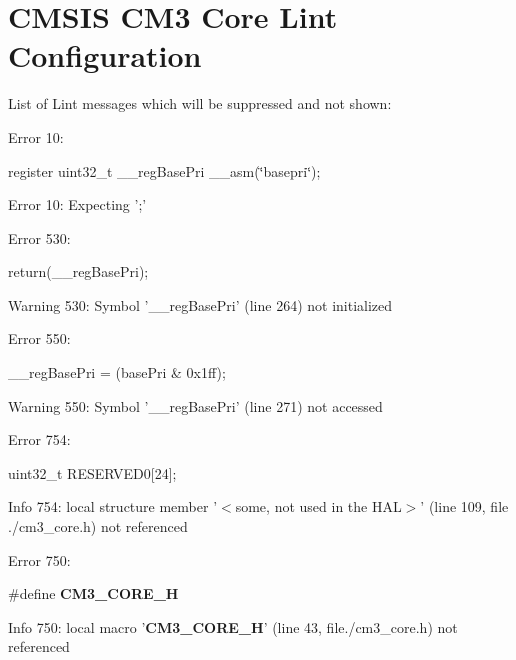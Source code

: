 \hypertarget{group___c_m_s_i_s___c_m3__core___lint_cinfiguration}{\section{C\-M\-S\-I\-S C\-M3 Core Lint Configuration}
\label{group___c_m_s_i_s___c_m3__core___lint_cinfiguration}
}
List of Lint messages which will be suppressed and not shown\-:
\begin{DoxyItemize}
\item Error 10\-: \par
 register uint32\-\_\-t \-\_\-\-\_\-reg\-Base\-Pri \-\_\-\-\_\-asm(\char`\"{}basepri\char`\"{}); \par
 Error 10\-: Expecting ';'
\end{DoxyItemize}


\begin{DoxyItemize}
\item Error 530\-: \par
 return(\-\_\-\-\_\-reg\-Base\-Pri); \par
 Warning 530\-: Symbol '\-\_\-\-\_\-reg\-Base\-Pri' (line 264) not initialized
\end{DoxyItemize}


\begin{DoxyItemize}
\item Error 550\-: \par
 \-\_\-\-\_\-reg\-Base\-Pri = (base\-Pri \& 0x1ff); \par
 Warning 550\-: Symbol '\-\_\-\-\_\-reg\-Base\-Pri' (line 271) not accessed
\end{DoxyItemize}


\begin{DoxyItemize}
\item Error 754\-: \par
 uint32\-\_\-t R\-E\-S\-E\-R\-V\-E\-D0\mbox{[}24\mbox{]}; \par
 Info 754\-: local structure member '$<$some, not used in the H\-A\-L$>$' (line 109, file ./cm3\-\_\-core.h) not referenced
\end{DoxyItemize}


\begin{DoxyItemize}
\item Error 750\-: \par
 \#define {\bfseries C\-M3\-\_\-\-C\-O\-R\-E\-\_\-\-H} \par
 Info 750\-: local macro '{\bfseries C\-M3\-\_\-\-C\-O\-R\-E\-\_\-\-H}' (line 43, file./cm3\-\_\-core.h) not referenced
\end{DoxyItemize}


